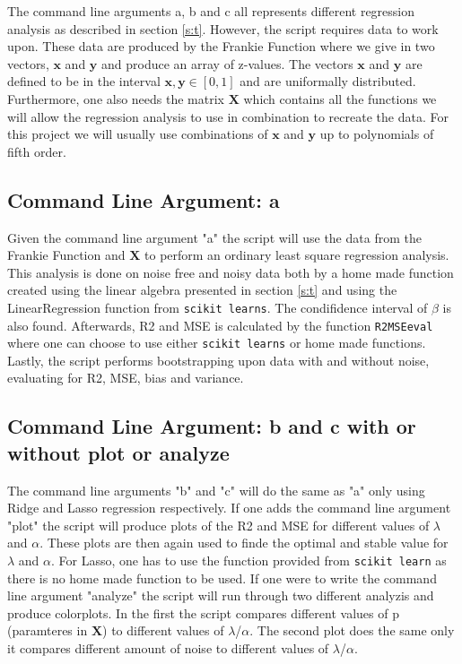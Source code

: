 \documentclass[12pt]{article}
\begin{document}
The command line arguments a, b and c all represents different regression analysis as described in section \ref{s:t}. However, the script requires data to work upon. These data are produced by the Frankie Function where we give in two vectors, $\bm{x}$ and $\bm{y}$ and produce an array of z-values. The vectors  $\bm{x}$ and $\bm{y}$ are defined to be in the interval $\bm{x}, \bm{y} \in [0,1]$ and are uniformally distributed. Furthermore, one also needs the matrix $\bm{X}$ which contains all the functions we will allow the regression analysis to use in combination to recreate the data. For this project we will usually use combinations of $\bm{x}$ and $\bm{y}$ up to polynomials of fifth order.
\subsection{Command Line Argument: a}
Given the command line argument "a" the script will use the data from the Frankie Function and $\bm{X}$ to perform an ordinary least square regression analysis. This analysis is done on noise free and noisy data both by a home made function created using the linear algebra presented in section \ref{s:t} and using the LinearRegression function from \texttt{scikit learns}. The condifidence interval of $\beta$ is also found. Afterwards, R2 and MSE is calculated by the function \texttt{R2MSEeval} where one can choose to use either \texttt{scikit learns} or home made functions. Lastly, the script performs bootstrapping upon data with and without noise, evaluating for R2, MSE, bias and variance.
\subsection{Command Line Argument: b and c with or without plot or analyze}
The command line arguments "b" and "c" will do the same as "a" only using Ridge and Lasso regression respectively. If one adds the command line argument "plot" the script will produce plots of the R2 and MSE for different values of $\lambda$ and $\alpha$. These plots are then again used to finde the optimal and stable value for $\lambda$ and $\alpha$. For Lasso, one has to use the function provided from \texttt{scikit learn} as there is no home made function to be used. If one were to write the command line argument "analyze" the script will run through two different analyzis and produce colorplots. In the first the script compares different values of p (paramteres in $\bm{X}$) to different values of $\lambda$/$\alpha$. The second plot does the same only it compares different amount of noise to different values of $\lambda$/$\alpha$.   
\end{document}
